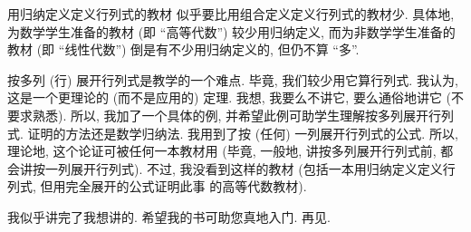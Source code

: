 用归纳定义定义行列式的教材%
似乎要比用组合定义定义行列式的教材少.
具体地, 为数学学生准备的教材
(即 ``高等代数'')
较少用归纳定义,
而为非数学学生准备的教材
(即 ``线性代数'')
倒是有不少用归纳定义的,
但仍不算 ``多''.

\vspace{2ex}

按多列 (行) 展开行列式是教学的一个难点.
毕竟, 我们较少用它算行列式.
我认为,
这是一个更理论的 (而不是应用的) 定理.
我想, 我要么不讲它, 要么通俗地讲它
(不要求熟悉).
所以, 我加了一个具体的例,
并希望此例可助学生理解按多列展开行列式.
证明的方法还是数学归纳法.
我用到了按 (任何) 一列展开行列式的公式.
所以, 理论地,
这个论证可被任何一本教材用
(毕竟, 一般地, 讲按多列展开行列式前,
都会讲按一列展开行列式).
不过, 我没看到这样的教材
(包括一本用归纳定义定义行列式,
但用完全展开的公式证明此事%
的高等代数教材).

\vspace{2ex}

我似乎讲完了我想讲的.
希望我的书可助您真地入门.
再见.
